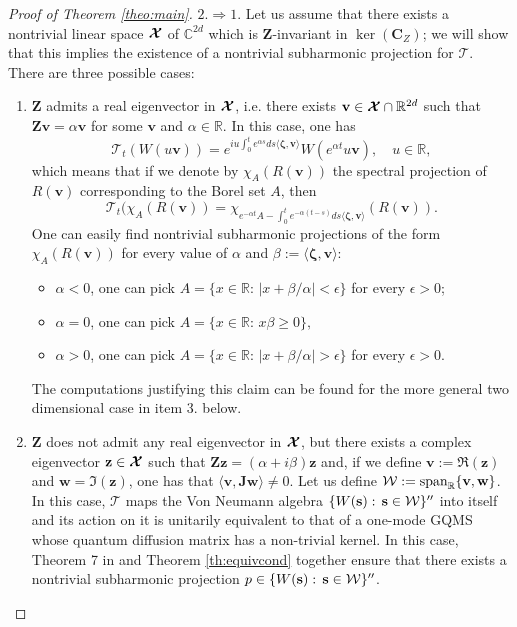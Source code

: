 \documentclass[preprint]{elsarticle}
\theoremstyle{definition}
\def\CC{\mathbb{C}}
\def\RR{\mathbb{R}}
\def\TT{\mathcal{T}}
\begin{document}
\begin{proof}[Proof of Theorem \ref{theo:main}]
\bigskip $2. \Rightarrow 1.$ Let us assume that there exists a nontrivial linear space $\boldsymbol{{\cal X}}$ of $\CC^{2d}$ which is $\mathbf{Z}$-invariant in $\ker(\mathbf{C}_{Z})$; we will show that this implies the existence of a nontrivial subharmonic projection for $\TT$. There are three possible cases:
\begin{enumerate}
\item $\mathbf{Z}$ admits a real eigenvector in $\boldsymbol{{\cal X}}$, i.e. there exists $\mathbf{v} \in \boldsymbol{{\cal X}}\cap \RR^{2d}$ such that $\mathbf{Z}\mathbf{v}=\alpha \mathbf{v}$ for some $\mathbf{v}$ and $\alpha \in \RR$. In this case, one has
$$\TT_{t}(W(u\mathbf{v}))=e^{iu\int_{0}^te^{\alpha s}ds\langle \boldsymbol{\zeta},\mathbf{v} \rangle }W(e^{\alpha t}u\mathbf{v}), \quad u \in \mathbb{R},$$
which means that if we denote by $\chi_{A}(R(\mathbf{v}))$ the spectral projection of $R(\mathbf{v})$ corresponding to the Borel set $A$, then
$$\TT_t(\chi_{A}(R(\mathbf{v}))=\chi_{e^{-\alpha t}A-\int_0^te^{-\alpha(t-s)}ds\langle \boldsymbol{\zeta},\mathbf{v} \rangle}(R(\mathbf{v})).$$
One can easily find nontrivial subharmonic projections of the form $\chi_{A}(R(\mathbf{v}))$ for every value of $\alpha$ and $\beta:=\langle \boldsymbol{\zeta},\mathbf{v} \rangle$:
\begin{itemize}
\item $\alpha<0$, one can pick $A=\{x \in \RR: \, |x+\beta/\alpha|<\epsilon\}$ for every $\epsilon>0$;
\item $\alpha=0$, one can pick $A=\{x \in \RR:\, x\beta  \geq 0\},$
\item $\alpha>0$, one can pick $A=\{x \in \RR: \, |x+\beta/\alpha|>\epsilon\}$ for every $\epsilon>0$.
\end{itemize}
The computations justifying this claim can be found for the more general two dimensional case in item 3. below.
\item $\mathbf{Z}$ does not admit any real eigenvector in $\boldsymbol{{\cal X}}$, but there exists a complex eigenvector $\mathbf{z} \in \boldsymbol{{\cal X}}$ such that $\mathbf{Z} \mathbf{z}=(\alpha+i\beta)\mathbf{z}$ and, if we define $\mathbf{v}:=\Re(\mathbf{z})$ and $\mathbf{w}=\Im(\mathbf{z})$, one has that $\langle \mathbf{v}, \mathbf{J}\mathbf{w} \rangle\neq 0$. Let us define ${\cal W}:={\rm span}_{\RR}\{\mathbf{v}, \mathbf{w}\}$. In this case, $\TT$ maps the Von Neumann algebra $\{W(\mathbf{s}): \, \mathbf{s} \in {\cal W}\}^{\prime\prime}$ into itself and its action on it is unitarily equivalent to that of a one-mode GQMS whose quantum diffusion matrix has a non-trivial kernel. In this case, Theorem 7 in \cite{AFP21} and Theorem \ref{th:equivcond} together ensure that there exists a nontrivial subharmonic projection $p \in \{W(\mathbf{s}): \, \mathbf{s} \in {\cal W}\}^{\prime\prime}$.

\end{enumerate}
\end{proof}
\end{document}
